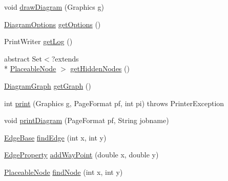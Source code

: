 \begin{DoxyCompactItemize}
\item 
void \hyperlink{classorg_1_1tzi_1_1use_1_1gui_1_1views_1_1diagrams_1_1_diagram_view_a03910a062c2d28ab6939f55308b82a9c}{draw\-Diagram} (Graphics g)
\item 
\hyperlink{classorg_1_1tzi_1_1use_1_1gui_1_1views_1_1diagrams_1_1_diagram_options}{Diagram\-Options} \hyperlink{classorg_1_1tzi_1_1use_1_1gui_1_1views_1_1diagrams_1_1_diagram_view_a8e2bc96fd9b2d64182e904c30e8cdff6}{get\-Options} ()
\item 
Print\-Writer \hyperlink{classorg_1_1tzi_1_1use_1_1gui_1_1views_1_1diagrams_1_1_diagram_view_a98bda73a60b4002fa95cc961e9892151}{get\-Log} ()
\item 
abstract Set$<$?extends \\*
\hyperlink{classorg_1_1tzi_1_1use_1_1gui_1_1views_1_1diagrams_1_1elements_1_1_placeable_node}{Placeable\-Node} $>$ \hyperlink{classorg_1_1tzi_1_1use_1_1gui_1_1views_1_1diagrams_1_1_diagram_view_a81beea8e68617e00c2c6cc316e06ad22}{get\-Hidden\-Nodes} ()
\item 
\hyperlink{classorg_1_1tzi_1_1use_1_1gui_1_1views_1_1diagrams_1_1_diagram_graph}{Diagram\-Graph} \hyperlink{classorg_1_1tzi_1_1use_1_1gui_1_1views_1_1diagrams_1_1_diagram_view_a798f821f953cdde9ce3b351d5cd23f50}{get\-Graph} ()
\item 
int \hyperlink{classorg_1_1tzi_1_1use_1_1gui_1_1views_1_1diagrams_1_1_diagram_view_ae36a015064b64e5c05ba95ce2bdda29a}{print} (Graphics g, Page\-Format pf, int pi)  throws Printer\-Exception 
\item 
void \hyperlink{classorg_1_1tzi_1_1use_1_1gui_1_1views_1_1diagrams_1_1_diagram_view_adc461a0d57d58be18084c928dff74c49}{print\-Diagram} (Page\-Format pf, String jobname)
\item 
\hyperlink{classorg_1_1tzi_1_1use_1_1gui_1_1views_1_1diagrams_1_1elements_1_1edges_1_1_edge_base}{Edge\-Base} \hyperlink{classorg_1_1tzi_1_1use_1_1gui_1_1views_1_1diagrams_1_1_diagram_view_a674f158ffcc6a785477d40754e976e45}{find\-Edge} (int x, int y)
\item 
\hyperlink{classorg_1_1tzi_1_1use_1_1gui_1_1views_1_1diagrams_1_1elements_1_1_edge_property}{Edge\-Property} \hyperlink{classorg_1_1tzi_1_1use_1_1gui_1_1views_1_1diagrams_1_1_diagram_view_a5cbe3d4c56fa7a84544d3c9dff440f5b}{add\-Way\-Point} (double x, double y)
\item 
\hyperlink{classorg_1_1tzi_1_1use_1_1gui_1_1views_1_1diagrams_1_1elements_1_1_placeable_node}{Placeable\-Node} \hyperlink{classorg_1_1tzi_1_1use_1_1gui_1_1views_1_1diagrams_1_1_diagram_view_a1ed9dbd84a84a378837ab46e73c6e6dc}{find\-Node} (int x, int y)

\end{DoxyCompactItemize}
